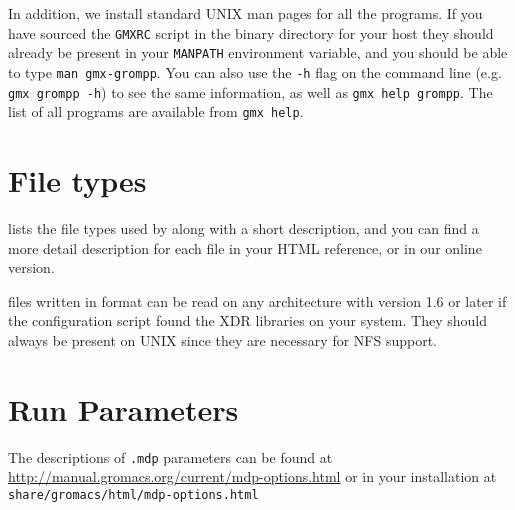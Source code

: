 In addition, we install standard UNIX man pages for all the programs. If
you have sourced the {\tt GMXRC} script in the {\gromacs} binary directory for
your host they should already be present in your {\tt MANPATH} environment variable, and you
should be able to type {\eg} {\tt man gmx-grompp}. You can also use
the {\tt -h} flag on the command line (e.g. {\tt gmx grompp -h}) to
see the same information, as well as {\tt gmx help grompp}.
The list of all programs are available from {\tt gmx help}.

\section{File types}
\label{sec:fileformats}
 lists the file types used by {\gromacs} along with
a short description, and you can find a more detail description for
each file in your HTML reference, or in our online version.

{\gromacs} files written in  format can be read on any
architecture with {\gromacs} version 1.6 or later if the configuration
script found the XDR libraries on your system. They should always be
present on UNIX since they are necessary for NFS support.



\section{Run Parameters}
The descriptions of {\tt .mdp} parameters can be found at
\url{http://manual.gromacs.org/current/mdp-options.html}
or in your installation at {\tt share/gromacs/html/mdp-options.html}

